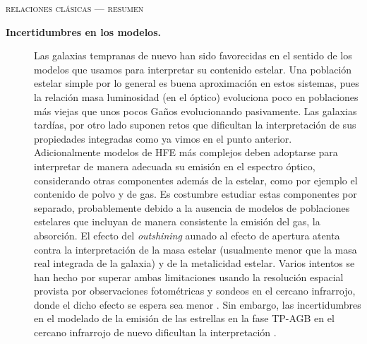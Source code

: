 \documentclass[xcolor=dvipsnames,4pt,hyperref={colorlinks,citecolor=black,linkcolor=black,urlcolor=black}]{beamer}
\begin{document}
\begin{frame}{\textsc{relaciones clásicas --- resumen}}
\begin{description}
\item[\textbf{Incertidumbres en los modelos.}] Las galaxias tempranas de nuevo han sido favorecidas
en el sentido de los modelos que usamos para interpretar su contenido estelar. Una población estelar
simple por lo general es buena aproximación en estos sistemas, pues la relación masa luminosidad (en
el óptico) evoluciona poco en poblaciones más viejas que unos pocos Gaños evolucionando pasivamente.
Las galaxias tardías, por otro lado suponen retos que dificultan la interpretación de sus
propiedades integradas como ya vimos en el punto anterior. Adicionalmente modelos de HFE más
complejos deben adoptarse para interpretar de manera adecuada su emisión en el espectro óptico,
considerando otras componentes además de la estelar, como por ejemplo el contenido de polvo y de
gas. Es costumbre estudiar estas componentes por separado, probablemente debido a la ausencia de
modelos de poblaciones estelares que incluyan de manera consistente la emisión del gas, la
absorción. El efecto del \emph{outshining} aunado al efecto de apertura atenta contra la
interpretación de la masa estelar (usualmente menor que la masa real integrada de la galaxia) y de
la metalicidad estelar. Varios intentos se han hecho por superar ambas limitaciones usando la
resolución espacial provista por observaciones fotométricas \citep{Sorba2015} y sondeos en el
cercano infrarrojo, donde el dicho efecto se espera sea menor \citep{Eminian2008}. Sin embargo, las
incertidumbres en el modelado de la emisión de las estrellas en la fase TP-AGB en el cercano
infrarrojo de nuevo dificultan la interpretación \citep{Zibetti2013}.
%
\end{description}
\end{frame}
\end{document}
